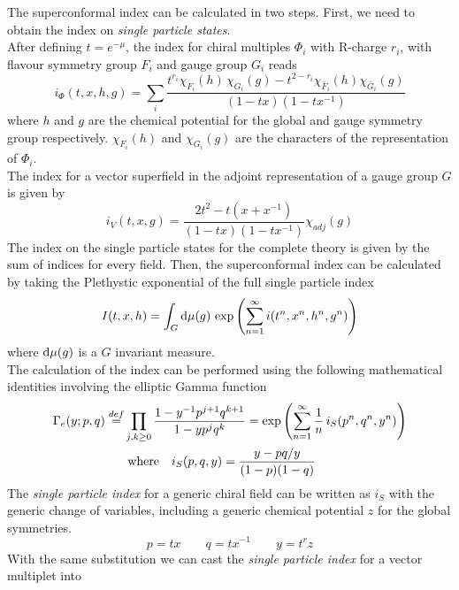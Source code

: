 The superconformal index can be calculated in two steps.
First, we need to obtain the index on \emph{single particle states}.\\
After defining $t = e^{-\mu}$, the index for chiral multiples $\Phi_i$ with R-charge $r_i$, with flavour symmetry group $F_i$ and gauge group $G_i$ reads \cite{Dolan:2008qi}
\begin{equation}
i_{\Phi}(t,x,h,g) = \sum_{i} \frac{ t^{r_i} \chi_{F_i}(h) \, \chi_{G_i}(g) - t^{2-r_i} \chi_{\bar{F}_i}(h) \chi_{\bar{G}_i}(g)}{ (1-tx) (1- t x^{-1})}
\end{equation}
where $h$ and $g$ are the chemical potential for the global and gauge symmetry group respectively. $\chi_{F_i}(h)$ and $\chi_{G_i}(g)$ are the characters of the representation of $\Phi_i$.\\
The index for a vector superfield in the adjoint representation of a gauge group $G$ is given by \cite{Dolan:2008qi}
\begin{equation}
i_{V} (t,x,g) = \frac{2 t^2 - t(x + x^{-1})}{(1-tx) (1 - tx^{-1})} \chi_{adj}(g)
\end{equation}
The index on the single particle states for the complete theory is given by the sum of indices for every field. 
Then, the superconformal index can be calculated by taking the Plethystic exponential \cite{Feng:2007ur} of the full single particle index
\begin{equation}
  I(t,x,h) = \int_{G} \hbox{d} \mu(g)\,  \exp{ \left(  \sum_{n=1}^{\infty}i(t^n,x^n,h^n,g^n) \right)}
  \end{equation}  
where $\hbox{d} \mu(g)$ is a $G$ invariant measure.\\
The calculation of the index can be performed using the following mathematical identities involving the elliptic Gamma function
\begin{align}
\Gamma_e ( y; p, q) \overset{def}{=} & \prod_{j,k \geq 0} \frac{1 - y^{-1}p^{j+1}q^{k+1}}{1 - y p^j q^k} = \exp \left(  
\sum_{n=1}^{\infty} \frac{1}{n} \, i_S(p^n,q^n,y^n)
\right)\\
& \; \hbox{where} \quad i_S(p,q,y) = \frac{y - pq/y}{(1-p)(1-q)}
\end{align}
The \emph{single particle index} for a generic chiral field can be written as $i_S$ with the generic change of variables, including a generic chemical potential $z$ for the global symmetries. 
\begin{equation}
p = tx \qquad q = t x^{-1} \qquad y = t^r z
\end{equation}
With the same substitution we can cast the \emph{single particle index} for a vector multiplet into
